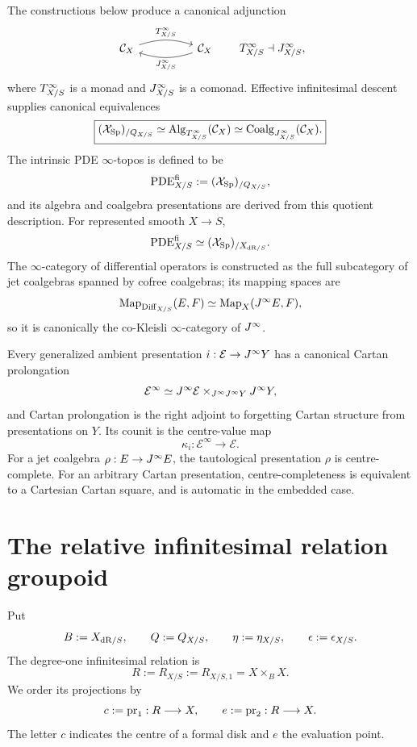 The constructions below produce a canonical adjunction
\[
\begin{tikzcd}[column sep=huge]
\mathcal C_X
  \arrow[r, bend left=18, "\Tinf_{X/S}"]
& \mathcal C_X
  \arrow[l, bend left=18, "\Jinf_{X/S}"]
\end{tikzcd}
\qquad
\Tinf_{X/S}\dashv \Jinf_{X/S},
\]
where $T^{\infty}_{X/S}$ is a monad and $J^{\infty}_{X/S}$ is a comonad.  Effective infinitesimal descent supplies canonical equivalences
\[
\boxed{
    (\mathcal{X}_{\mathrm{Sp}})_{/Q_{X/S}}
    \simeq
    \operatorname{Alg}_{T^{\infty}_{X/S}}(\mathcal C_X)
    \simeq
    \operatorname{Coalg}_{J^{\infty}_{X/S}}(\mathcal C_X).
}
\]
The intrinsic PDE $\infty$-topos is defined to be
\[
    \operatorname{PDE}^{\mathrm{fi}}_{X/S}:=(\mathcal{X}_{\mathrm{Sp}})_{/Q_{X/S}},
\]
and its algebra and coalgebra presentations are derived from this quotient description.  For represented smooth $X\to S$,
\[
    \operatorname{PDE}^{\mathrm{fi}}_{X/S}\simeq(\mathcal{X}_{\mathrm{Sp}})_{/X_{\mathrm{dR}/S}}.
\]
The $\infty$-category of differential operators is constructed as the full subcategory of jet coalgebras spanned by cofree coalgebras; its mapping spaces are
\[
    \operatorname{Map}_{\operatorname{Diff}_{X/S}}(E,F)\simeq\operatorname{Map}_X(J^{\infty} E,F),
\]
so it is canonically the co-Kleisli $\infty$-category of $J^{\infty}$.

Every generalized ambient presentation $i:\mathcal E\to J^{\infty} Y$ has a canonical Cartan prolongation
\[
    \mathcal E^\infty
    \simeq
    J^{\infty}\mathcal E\times_{J^{\infty}J^{\infty} Y}J^{\infty} Y,
\]
and Cartan prolongation is the right adjoint to forgetting Cartan structure from presentations on $Y$.  Its counit is the centre-value map
\[
    \kappa_i:\mathcal E^\infty\to\mathcal E.
\]
For a jet coalgebra $\rho:E\to J^{\infty} E$, the tautological presentation $\rho$ is centre-complete.  For an arbitrary Cartan presentation, centre-completeness is equivalent to a Cartesian Cartan square, and is automatic in the embedded case.

\section{The relative infinitesimal relation groupoid}
\label{sec:jets-relation}

Put
\[
    B:=X_{\mathrm{dR}/S},
    \qquad
    Q:=Q_{X/S},
    \qquad
    \eta:=\eta_{X/S},
    \qquad
    \epsilon:=\epsilon_{X/S}.
\]
The degree-one infinitesimal relation is
\[
    R:=R_{X/S}:=R_{X/S,1}=X\times_BX.
\]
We order its projections by
\[
    c:=\operatorname{pr}_1:R\longrightarrow X,
    \qquad
    e:=\operatorname{pr}_2:R\longrightarrow X.
\]
The letter $c$ indicates the centre of a formal disk and $e$ the evaluation point.

